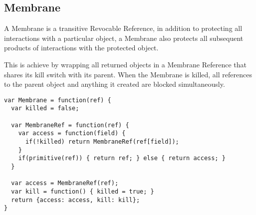 \documentclass[a4paper,notitlepage]{report}
\begin{document}


\subsection{Membrane}
\label{sec:membrane}
A Membrane is a transitive Revocable Reference, in addition to protecting all
interactions with a particular object, a Membrane also protects all subsequent
products of interactions with the protected object.

This is achieve by wrapping all returned objects in a Membrane Reference that
shares its kill switch with its parent. When the Membrane is killed, all
references to the parent object and anything it created are blocked
simultaneously.

\begin{verbatim}
var Membrane = function(ref) {
  var killed = false;

  var MembraneRef = function(ref) {
    var access = function(field) {
      if(!killed) return MembraneRef(ref[field]);
    }
    if(primitive(ref)) { return ref; } else { return access; }
  }

  var access = MembraneRef(ref);
  var kill = function() { killed = true; }
  return {access: access, kill: kill};
}
\end{verbatim}
\end{document}
